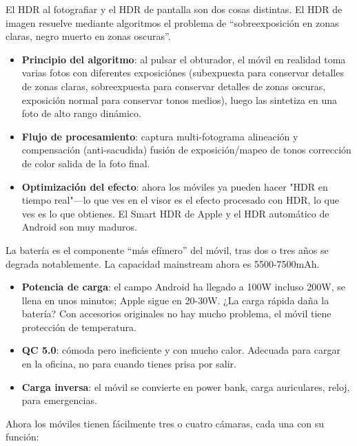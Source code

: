 
El HDR al fotografiar y el HDR de pantalla son dos cosas distintas. El HDR de imagen resuelve mediante algoritmos el problema de “sobreexposición en zonas claras, negro muerto en zonas oscuras”.

\begin{itemize}
  \item \textbf{Principio del algoritmo}: al pulsar el obturador, el móvil en realidad toma varias fotos con diferentes exposiciónes (subexpuesta para conservar detalles de zonas claras, sobreexpuesta para conservar detalles de zonas oscuras, exposición normal para conservar tonos medios), luego las sintetiza en una foto de alto rango dinámico.
  \item \textbf{Flujo de procesamiento}: captura multi-fotograma alineación y compensación (anti-sacudida) fusión de exposición/mapeo de tonos corrección de color salida de la foto final.
  \item \textbf{Optimización del efecto}: ahora los móviles ya pueden hacer "HDR en tiempo real"—lo que ves en el visor es el efecto procesado con HDR, lo que ves es lo que obtienes. El Smart HDR de Apple y el HDR automático de Android son muy maduros.
\end{itemize}


La batería es el componente “más efímero” del móvil, tras dos o tres años se degrada notablemente. La capacidad mainstream ahora es 5500-7500mAh.

\begin{itemize}
  \item \textbf{Potencia de carga}: el campo Android ha llegado a 100W incluso 200W, se llena en unos minutos; Apple sigue en 20-30W. ¿La carga rápida daña la batería? Con accesorios originales no hay mucho problema, el móvil tiene protección de temperatura.
  \item \textbf{QC 5.0}: cómoda pero ineficiente y con mucho calor. Adecuada para cargar en la oficina, no para cuando tienes prisa por salir.
  \item \textbf{Carga inversa}: el móvil se convierte en power bank, carga auriculares, reloj, para emergencias.
\end{itemize}


Ahora los móviles tienen fácilmente tres o cuatro cámaras, cada una con su función:

